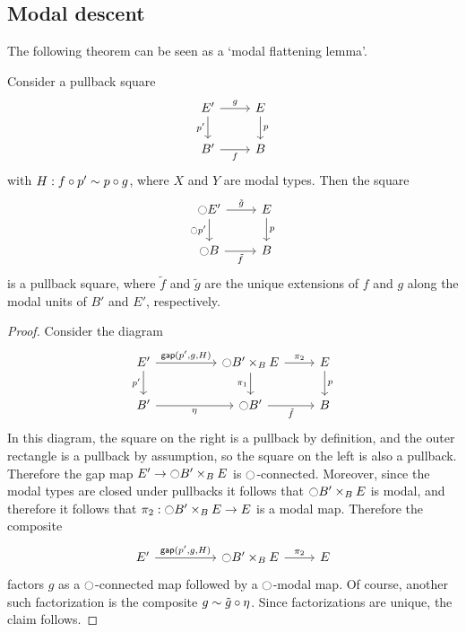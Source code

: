 \subsection{Modal descent}

The following theorem can be seen as a `modal flattening lemma'.
\begin{thm}\label{thm:etale_flattening}
Consider a pullback square
\begin{equation*}
\begin{tikzcd}
E' \arrow[d,swap,"{p'}"] \arrow[r,"g"] & E \arrow[d,"p"] \\
B' \arrow[r,swap,"f"] & B
\end{tikzcd}
\end{equation*}
with $H:f\circ p'\sim p\circ g$, where $X$ and $Y$ are modal types. Then the square
\begin{equation*}
\begin{tikzcd}
\modal E' \arrow[r,"\tilde{g}"] \arrow[d,swap,"{\modal p'}"] & E \arrow[d,"p"] \\
\modal B \arrow[r,swap,"\tilde{f}"] & B
\end{tikzcd}
\end{equation*}
is a pullback square, where $\tilde{f}$ and $\tilde{g}$ are the unique extensions of $f$ and $g$ along the modal units of $B'$ and $E'$, respectively.
\end{thm}

\begin{proof}
Consider the diagram
\begin{equation*}
\begin{tikzcd}
E' \arrow[r,"{\mathsf{gap}(p',g,H)}"] \arrow[d,swap,"{p'}"] &[2.5em] \modal B'\times_{B} E \arrow[r,"\pi_2"] \arrow[d,swap,"\pi_1"] & E \arrow[d,"p"] \\
B' \arrow[r,swap,"\modalunit"] & \modal B' \arrow[r,swap,"\tilde{f}"] & B
\end{tikzcd}
\end{equation*}
In this diagram, the square on the right is a pullback by definition, and the outer rectangle is a pullback by assumption, so the square on the left is also a pullback. Therefore the gap map $E'\to {\ensuremath{\ocircle}} B'\times_B E$ is ${\ocircle}$-connected. Moreover, since the modal types are closed under pullbacks it follows that ${\ocircle} B'\times_B E$ is modal, and therefore it follows that $\pi_2:{\ocircle} B'\times_B E\to E$ is a modal map. Therefore the composite
\begin{equation*}
\begin{tikzcd}
E' \arrow[r,"{\mathsf{gap}(p',g,H)}"] &[2.5em] \modal B'\times_{B} E \arrow[r,"\pi_2"] & E 
\end{tikzcd}
\end{equation*}
factors $g$ as a ${\ocircle}$-connected map followed by a ${\ocircle}$-modal map. Of course, another such factorization is the composite $g\sim \tilde{g}\circ{\eta_{}}$. Since factorizations are unique, the claim follows.
\end{proof}

